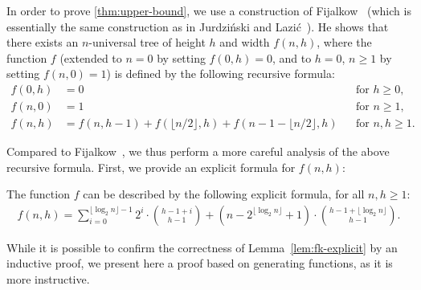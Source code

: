 \documentclass[envcountsect,envcountsame]{llncs}
\newcommand{\floor}[1]{\lfloor#1\rfloor}
\newcommand{\fk}{f}
\begin{document}
	In order to prove \cref{thm:upper-bound}, we use a construction of Fijalkow~\cite[Theorem 4]{fijalkow}
	(which is essentially the same construction as in Jurdziński and Lazić~\cite{progress-measure}).
	He shows that there exists an $n$-universal tree of height $h$ and width $\fk(n, h)$, where the function $\fk$
	(extended to $n=0$ by setting $\fk(0, h)=0$, and to $h=0$, $n\geq 1$ by setting $\fk(n,0)=1$)
	is defined by the following recursive formula:
	\begin{align}
		\fk(0, h) &= 0&& \text{for } h\geq 0,\nonumber\\
		\fk(n, 0) &= 1&& \text{for } n\geq 1,\nonumber\\
		\fk(n, h) &= \fk(n, h - 1) + \fk(\floor{n / 2}, h) + \fk(n - 1 - \floor{n / 2}, h)&& \text{for } n, h \geq 1.
			\label{eq:fk-recursive}
	\end{align}

	Compared to Fijalkow~\cite{fijalkow}, we thus perform a more careful analysis of the above recursive formula.
	First, we provide an explicit formula for $\fk(n, h)$:

	\begin{lemma}\label{lem:fk-explicit}
		The function $\fk$ can be described by the following explicit formula, for all $n,h\geq1$:
		\begin{align*}
			\fk(n, h) = \sum_{i = 0}^{\lfloor \log_2 n \rfloor - 1} 2^i\cdot\binom{h - 1 + i}{h - 1}
				+ (n - 2^{\lfloor \log_2 n \rfloor} + 1)\cdot\binom{h - 1 + \lfloor \log_2 n \rfloor}{h - 1}.
		\end{align*}
	\end{lemma}

	While it is possible to confirm the correctness of Lemma~\ref{lem:fk-explicit} by an inductive proof,
	we present here a proof based on generating functions, as it is more instructive.
\end{document}
